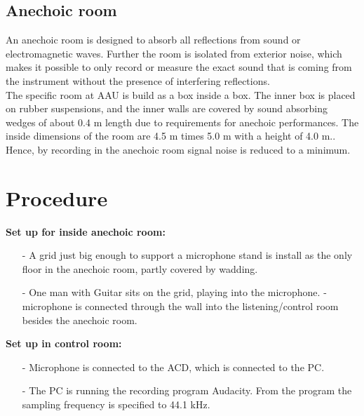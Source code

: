 \subsection{Anechoic room} 
An anechoic room is designed to absorb all reflections from sound or electromagnetic waves. Further the room is isolated from exterior noise, which makes it possible to only record or measure the exact sound that is coming from the instrument without the presence of interfering reflections. \\ The specific room at AAU is build as a box inside a box. The inner box is placed on rubber suspensions, and the inner walls are covered by sound absorbing wedges of about 0.4 m length due to requirements for anechoic performances. The inside dimensions of the room are 4.5 m times 5.0 m with a height of 4.0 m.\cite{anechoic}.\\
Hence, by recording in the anechoic room signal noise is reduced to a minimum.

\section{Procedure}
\textbf{Set up for inside anechoic room:}\\
\begin{itemize}
\item[-] A grid just big enough to support a microphone stand is install as the only floor in the anechoic room, partly covered by wadding. 
\item[-] One man with Guitar sits on the grid, playing into the microphone. 
- microphone is connected through the wall into the listening/control room besides the anechoic room. 
\end{itemize}   
\textbf{Set up in control room: }
\begin{itemize}
\item[-] Microphone is connected to the ACD, which is connected to the PC.
\item[-] The PC is running the recording program Audacity. From the program the sampling frequency is specified to 44.1 kHz.     
\end{itemize}

